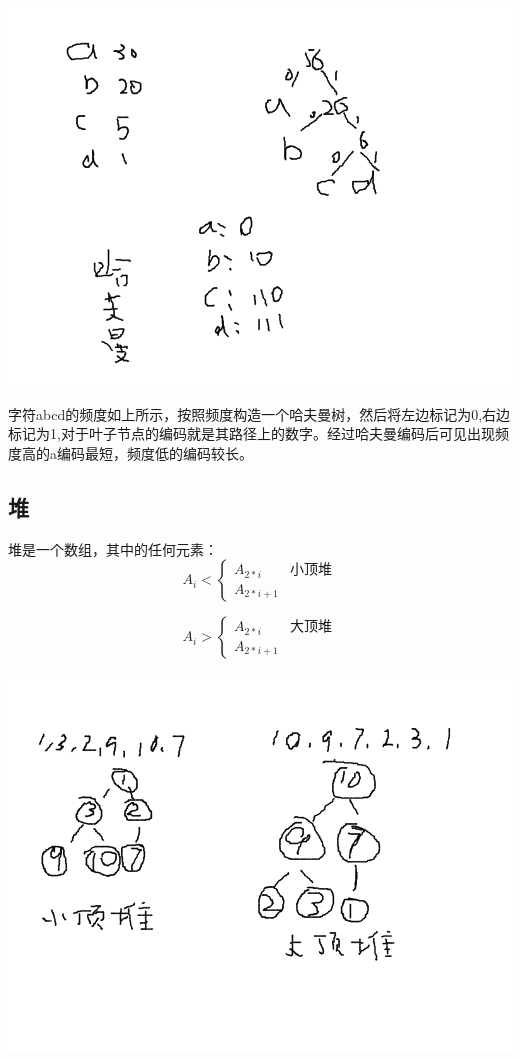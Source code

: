 \documentclass{article}
\begin{document}
		\includegraphics[scale=0.4]{./pic/tree-05.png}

		字符abcd的频度如上所示，按照频度构造一个哈夫曼树，然后将左边标记为0,右边标记为1,对于叶子节点的编码就是其路径上的数字。经过哈夫曼编码后可见出现频度高的a编码最短，频度低的编码较长。

	\subsection{堆}
		
		堆是一个数组，其中的任何元素：
		\[
			A_{i}<
				\left\{
					\begin{array}{ll}
						A_{2*i} & \textbf{小顶堆}\\
						A_{2*i+1}
					\end{array}
				\right .	
		\]

		\[
			A_{i}>
				\left\{
					\begin{array}{ll}
						A_{2*i} & \textbf{大顶堆}\\
						A_{2*i+1}
					\end{array}
				\right .	
		\]

		\includegraphics[scale=0.4]{./pic/tree-06.png}
\end{document}
